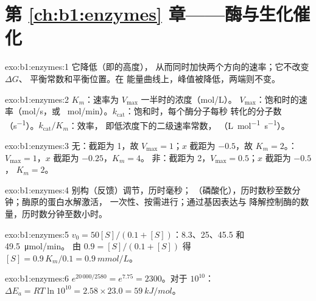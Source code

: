 \section*{第 \ref{ch:b1:enzymes} 章——酶与生化催化}

\begin{solution}{exo:b1:enzymes:1}
它降低（即的高度），
从而同时加快两个方向的速率；它不改变 $\Delta G$、
平衡常数和平衡位置。在
能量曲线上，峰值被降低，两端则不变。
\end{solution}

\begin{solution}{exo:b1:enzymes:2}
$K_m$：速率为 $V_{\max}$ 一半时的浓度（\unit{mol/L}）。
$V_{\max}$：饱和时的速率（\unit{mol/s}，或 \unit{\micro
mol/min}）。$k_{\text{cat}}$：饱和时，每个酶分子每秒
转化的分子数（\unit{s^{-1}}）。$k_{\text{cat}}/K_m$：效率，
即低浓度下的二级速率常数，
（\unit{L.mol^{-1}.s^{-1}}）。
\end{solution}

\begin{solution}{exo:b1:enzymes:3}
无：截距为 1，故 $V_{\max} = 1$；$x$ 截距为 $-0.5$，故
$K_m = 2$。：$V_{\max} = 1$，$x$ 截距为 $-0.25$，$K_m = 4$。
非：截距为 2，$V_{\max} = 0.5$；$x$ 截距为 $-0.5$，
$K_m = 2$。
\end{solution}

\begin{solution}{exo:b1:enzymes:4}
别构（反馈）调节，历时毫秒；
（磷酸化），历时数秒至数分钟；酶原的蛋白水解激活，
一次性、按需进行；通过基因表达与
降解控制酶的数量，历时数分钟至数小时。
\end{solution}

\begin{solution}{exo:b1:enzymes:5}
$v_0 = 50[S]/(0.1 + [S])$：8.3、25、45.5 和 \qty{49.5}{\micro mol/min}。
由 $0.9 = [S]/(0.1 + [S])$ 得 $[S] = 0.9\,K_m/0.1 = \qty{0.9}{mmol/L}$。
\end{solution}

\begin{solution}{exo:b1:enzymes:6}
$e^{20\,000/2580} = e^{7.75} = 2300$。对于 $10^{10}$：$\Delta E_a =
RT\ln 10^{10} = 2.58\times 23.0 = \qty{59}{kJ/mol}$。
\end{solution}

